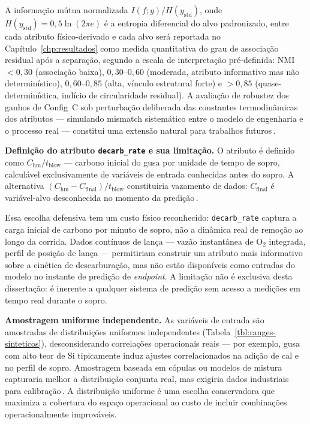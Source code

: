 A informação mútua normalizada $I(f; y) / H(y_\text{std})$, onde $H(y_\text{std}) = 0{,}5\ln(2\pi e)$ é a entropia diferencial do alvo padronizado, entre cada atributo físico-derivado e cada alvo será reportada no Capítulo~\ref{chp:resultados} como medida quantitativa do grau de associação residual após a separação, segundo a escala de interpretação pré-definida: NMI $< 0{,}30$ (associação baixa), $0{,}30$--$0{,}60$ (moderada, atributo informativo mas não determinístico), $0{,}60$--$0{,}85$ (alta, vínculo estrutural forte) e $> 0{,}85$ (quase-determinística, indício de circularidade residual). A avaliação de robustez dos ganhos de Config~C sob perturbação deliberada das constantes termodinâmicas dos atributos — simulando mismatch sistemático entre o modelo de engenharia e o processo real — constitui uma extensão natural para trabalhos futuros\,\cite{buggineni2024synthetic,willard2020integrating}.

\textbf{Definição do atributo \texttt{decarb\_rate} e sua limitação.}
O atributo é definido como $C_\text{hm} / t_\text{blow}$ — carbono inicial do gusa por unidade de tempo de sopro, calculável exclusivamente de variáveis de entrada conhecidas antes do sopro. A alternativa $(C_\text{hm} - C_\text{final}) / t_\text{blow}$ constituiria vazamento de dados: $C_\text{final}$ é variável-alvo desconhecida no momento da predição\,\cite{chattopadhyay2022hybrid,bae2020bof}.

Essa escolha defensiva tem um custo físico reconhecido: \texttt{decarb\_rate} captura a carga inicial de carbono por minuto de sopro, não a dinâmica real de remoção ao longo da corrida. Dados contínuos de lança — vazão instantânea de O$_2$ integrada, perfil de posição de lança — permitiriam construir um atributo mais informativo sobre a cinética de descarburação, mas não estão disponíveis como entradas do modelo no instante de predição de \textit{endpoint}. A limitação não é exclusiva desta dissertação: é inerente a qualquer sistema de predição sem acesso a medições em tempo real durante o sopro.

\textbf{Amostragem uniforme independente.} As variáveis de entrada são amostradas de distribuições uniformes independentes (Tabela~\ref{tbl:ranges-sinteticos}), desconsiderando correlações operacionais reais --- por exemplo, gusa com alto teor de Si tipicamente induz ajustes correlacionados na adição de cal e no perfil de sopro. Amostragem baseada em cópulas ou modelos de mistura capturaria melhor a distribuição conjunta real, mas exigiria dados industriais para calibração\,\cite{morales2025synthetic}. A distribuição uniforme é uma escolha conservadora que maximiza a cobertura do espaço operacional ao custo de incluir combinações operacionalmente improváveis.

